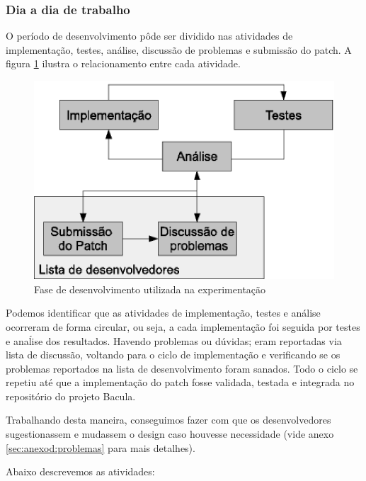 \subsubsection{Dia a dia de trabalho}
O período de desenvolvimento pôde ser dividido nas atividades de implementação, testes, análise, discussão de problemas e submissão do patch. A figura \ref{fig:resolucao_problemas} ilustra o relacionamento entre cada atividade. 
\begin{figure}[h]
 \centering
 \includegraphics{../../doc/diagramas/resolucao_problemas.eps}
 \caption[Fase de desenvolvimento]{Fase de desenvolvimento utilizada na experimentação}
 \label{fig:resolucao_problemas}
\end{figure}

Podemos identificar que as atividades de implementação, testes e análise ocorreram de forma circular, ou seja, a cada implementação foi seguida por testes e anaĺise dos resultados. Havendo problemas ou dúvidas; eram reportadas via lista de discussão, voltando para o ciclo de implementação e verificando se os problemas reportados na lista de desenvolvimento foram sanados. Todo o ciclo se repetiu até que a implementação do patch \patchshort fosse validada, testada e integrada no repositório do projeto Bacula.

Trabalhando desta maneira, conseguimos fazer com que os desenvolvedores sugestionassem e mudassem o design caso houvesse necessidade (vide anexo \ref{sec:anexod:problemas} para mais detalhes). 

Abaixo descrevemos as atividades:

